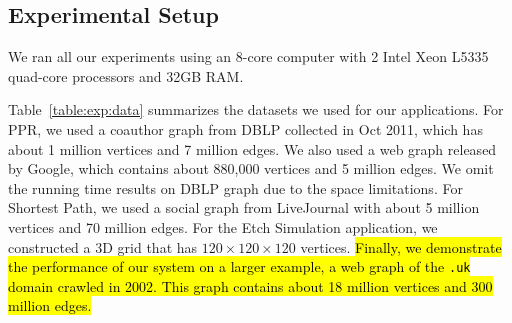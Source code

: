 \subsection{Experimental Setup}
\label{sec:expsetup}
We ran all our experiments using an 8-core computer with 2 Intel Xeon
L5335 quad-core processors and 32GB RAM.

Table~\ref{table:exp:data} summarizes the datasets we used for our
applications. For PPR, we used a coauthor graph from DBLP collected in
Oct 2011, which has about 1 million vertices and 7 million edges.
We also used a web graph released by Google, which contains about
880,000 vertices and 5 million edges. We omit the running time results on DBLP graph
due to the space limitations.
For Shortest Path, we used a social graph from LiveJournal with about
5 million vertices and 70 million edges. For the Etch Simulation
application, we constructed a 3D grid that has $120 \times 120 \times
120$ vertices.  
\hl{%
Finally, we demonstrate the performance of our system on a larger
example, a web graph of the {\tt .uk} domain crawled in 2002.
This graph contains about 18 million vertices and 300 million edges. 
}


